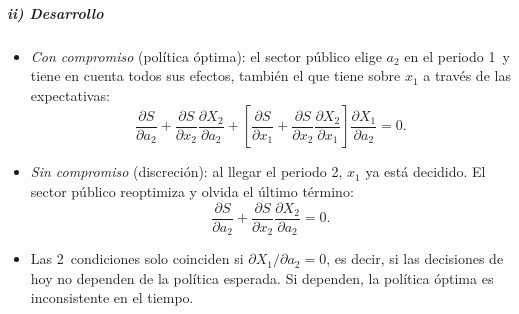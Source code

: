\documentclass[11pt]{article}
\begin{document}
\subparagraph{ii) Desarrollo}
\begin{itemize}
\item \emph{Con compromiso} (política óptima): el sector público elige $a_2$ en el periodo 1~y tiene en cuenta todos sus efectos, también el que tiene sobre $x_1$ a través de las expectativas:
  \begin{equation}\label{eq:kp-optima}
  \frac{\partial S}{\partial a_2}+\frac{\partial S}{\partial x_2}\frac{\partial X_2}{\partial a_2}+\left[\frac{\partial S}{\partial x_1}+\frac{\partial S}{\partial x_2}\frac{\partial X_2}{\partial x_1}\right]\frac{\partial X_1}{\partial a_2}=0.
  \end{equation}
\item \emph{Sin compromiso} (discreción): al llegar el periodo 2, $x_1$ ya está decidido. El sector público reoptimiza y olvida el último término:
  \begin{equation}\label{eq:kp-discrecion}
  \frac{\partial S}{\partial a_2}+\frac{\partial S}{\partial x_2}\frac{\partial X_2}{\partial a_2}=0.
  \end{equation}
\item Las 2~condiciones solo coinciden si $\partial X_1/\partial a_2=0$, es decir, si las decisiones de hoy no dependen de la política esperada. Si dependen, la política óptima es inconsistente en el tiempo.
\end{itemize}
\end{document}
